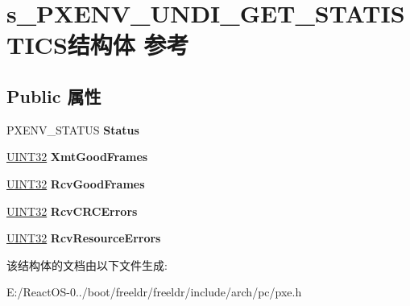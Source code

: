 \hypertarget{structs___p_x_e_n_v___u_n_d_i___g_e_t___s_t_a_t_i_s_t_i_c_s}{}\section{s\+\_\+\+P\+X\+E\+N\+V\+\_\+\+U\+N\+D\+I\+\_\+\+G\+E\+T\+\_\+\+S\+T\+A\+T\+I\+S\+T\+I\+C\+S结构体 参考}
\label{structs___p_x_e_n_v___u_n_d_i___g_e_t___s_t_a_t_i_s_t_i_c_s}
\subsection*{Public 属性}
\begin{DoxyCompactItemize}
\item 
\mbox{\label{structs___p_x_e_n_v___u_n_d_i___g_e_t___s_t_a_t_i_s_t_i_c_s_ab2128165efdacf31e2a948aa16e32569}} 
P\+X\+E\+N\+V\+\_\+\+S\+T\+A\+T\+US {\bfseries Status}
\item 
\mbox{\label{structs___p_x_e_n_v___u_n_d_i___g_e_t___s_t_a_t_i_s_t_i_c_s_a869bd76b19abe2c33922f3c00f545ec2}} 
\hyperlink{_processor_bind_8h_ae1e6edbbc26d6fbc71a90190d0266018}{U\+I\+N\+T32} {\bfseries Xmt\+Good\+Frames}
\item 
\mbox{\label{structs___p_x_e_n_v___u_n_d_i___g_e_t___s_t_a_t_i_s_t_i_c_s_a0b434837f95729084c9ad43fd0c947a4}} 
\hyperlink{_processor_bind_8h_ae1e6edbbc26d6fbc71a90190d0266018}{U\+I\+N\+T32} {\bfseries Rcv\+Good\+Frames}
\item 
\mbox{\label{structs___p_x_e_n_v___u_n_d_i___g_e_t___s_t_a_t_i_s_t_i_c_s_a12928d76a135e1effc6b3b7891c06e98}} 
\hyperlink{_processor_bind_8h_ae1e6edbbc26d6fbc71a90190d0266018}{U\+I\+N\+T32} {\bfseries Rcv\+C\+R\+C\+Errors}
\item 
\mbox{\label{structs___p_x_e_n_v___u_n_d_i___g_e_t___s_t_a_t_i_s_t_i_c_s_a9abf36b286ac5833b5ad5b310a889c6f}} 
\hyperlink{_processor_bind_8h_ae1e6edbbc26d6fbc71a90190d0266018}{U\+I\+N\+T32} {\bfseries Rcv\+Resource\+Errors}
\end{DoxyCompactItemize}


该结构体的文档由以下文件生成\+:\begin{DoxyCompactItemize}
\item 
E\+:/\+React\+O\+S-\/0../boot/freeldr/freeldr/include/arch/pc/pxe.\+h\end{DoxyCompactItemize}
